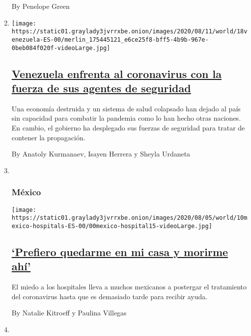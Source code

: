 \begin{enumerate}
  By Penelope Green
\item
  \texttt{[image: https://static01.graylady3jvrrxbe.onion/images/2020/08/11/world/18venezuela-ES-00/merlin\_175445121\_e6ce25f8-bff5-4b9b-967e-0beb084f020f-videoLarge.jpg]}

  \hypertarget{venezuela-enfrenta-al-coronavirus-con-la-fuerza-de-sus-agentes-de-seguridad}{%
  \subsection{\texorpdfstring{\href{/es/2020/08/19/espanol/america-latina/venezuela-represion-coronavirus.html}{Venezuela
  enfrenta al coronavirus con la fuerza de sus agentes de
  seguridad}}{Venezuela enfrenta al coronavirus con la fuerza de sus agentes de seguridad}}\label{venezuela-enfrenta-al-coronavirus-con-la-fuerza-de-sus-agentes-de-seguridad}}

  Una economía destruida y un sistema de salud colapsado han dejado al
  país sin capacidad para combatir la pandemia como lo han hecho otras
  naciones. En cambio, el gobierno ha desplegado sus fuerzas de
  seguridad para tratar de contener la propagación.

  By Anatoly Kurmanaev, Isayen Herrera y Sheyla Urdaneta
\item ~
  \hypertarget{muxe9xico}{%
  \subsubsection{México}\label{muxe9xico}}

  \texttt{[image: https://static01.graylady3jvrrxbe.onion/images/2020/08/05/world/10mexico-hospitals-ES-00/00mexico-hospital15-videoLarge.jpg]}

  \hypertarget{prefiero-quedarme-en-mi-casa-y-morirme-ahuxed}{%
  \subsection{\texorpdfstring{\href{/es/2020/08/10/espanol/america-latina/mexico-covid-hospitales.html}{`Prefiero
  quedarme en mi casa y morirme
  ahí'}}{`Prefiero quedarme en mi casa y morirme ahí'}}\label{prefiero-quedarme-en-mi-casa-y-morirme-ahuxed}}

  El miedo a los hospitales lleva a muchos mexicanos a postergar el
  tratamiento del coronavirus hasta que es demasiado tarde para recibir
  ayuda.

  By Natalie Kitroeff y Paulina Villegas
\item ~
  \hypertarget{amuxe9rica-latina-2}{%
}
\end{enumerate}
